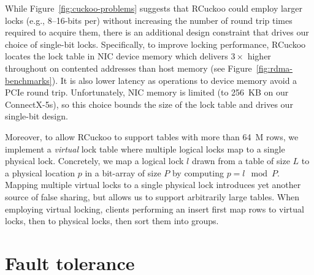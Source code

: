 While Figure~\ref{fig:cuckoo-problems} suggests that RCuckoo could
employ larger locks (e.g., 8--16-bits per) without increasing the
number of round trip times required to acquire them, there is an
additional design constraint that drives our choice of single-bit
locks.  Specifically, to improve locking performance, RCuckoo locates
the lock table in NIC device memory which delivers $3\times$ higher
throughout on contented addresses than host memory (see
Figure~\ref{fig:rdma-benchmarks}). It is also lower latency as
operations to device memory avoid a PCIe round trip.  Unfortunately, NIC memory is limited (to
256~KB on our ConnectX-5s), so this choice bounds the size of the lock
table and drives our single-bit design.

Moreover, to allow RCuckoo to support tables with more than 64~M rows,
we implement a \textit{virtual} lock table where multiple logical
locks map to a single physical lock.  Concretely, we map a logical
lock $l$ drawn from a table of size $L$ to a physical location $p$ in
a bit-array of size $P$ by computing $p = l \mod P$.  Mapping multiple
virtual locks to a single physical lock introduces yet another source
of false sharing, but allows us to support arbitrarily large tables.
When employing virtual locking, clients performing an insert first map
rows to virtual locks, then to physical locks, then sort them into
groups.







\section{Fault tolerance}
\label{sec:fault-tolerance}

